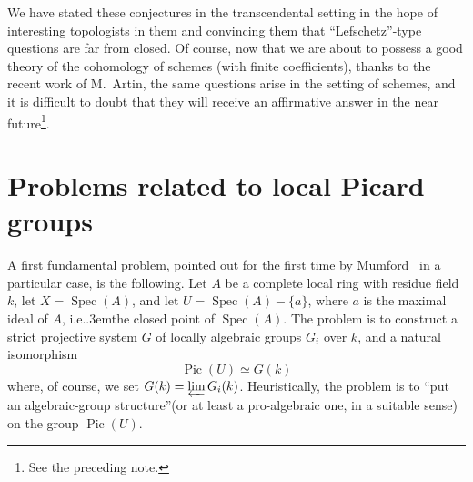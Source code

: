 \documentclass[11pt,a4paper,oneside]{book}
\providecommand{\sisi}[2]{#2}
\providecommand{\pageoriginale}{%
  \refstepcounter{pageoriginal}%
  \marginpar{\raggedright\footnotesize\bfseries\thepageoriginal}%
  \xspace}
\providecommand{\sfootnote}[1]{\footnote{#1}}
\providecommand{\og}{``}
\providecommand{\fg}{''\xspace}
\providecommand{\ie}{i.e.\kern.3em}
\providecommand{\Spec}{\operatorname{Spec}}
\providecommand{\Pic}{\operatorname{Pic}}
\theoremstyle{plain}
\theoremstyle{definition}
\theoremstyle{remark}
\begin{document}
We have stated these conjectures in the transcendental setting in the
hope of interesting topologists in them and convincing them that
\og Lefschetz\fg-type questions are far from closed. Of course, now that
we are about to possess a good theory of the cohomology of schemes (with
finite coefficients), thanks to the recent work of M.~\sisi{ARTIN}{Artin},
the same questions arise in the setting of schemes, and it is difficult
to doubt that they will receive an affirmative answer in the near
future\sfootnote{See the preceding note.}.

\section{Problems related to local Picard groups} \label{XIII.5}

A\pageoriginale first fundamental problem, pointed out for the first time by \sisi{MUMFORD}{Mumford}~\cite{XIII.5} in a particular case, is the following. Let $A$ be a complete local ring with residue field $k$, let $X=\Spec(A)$, and let $U=\Spec(A)-\{a\}$, where $a$ is the maximal ideal of $A$, \ie the closed point of $\Spec(A)$. The problem is to construct a strict projective system $G$ of locally algebraic groups $G_i$ over $k$, and a natural isomorphism
\begin{equation*} \label{eq:XIII.5.+} \tag{$+$} {\Pic(U)\simeq G(k)} \end{equation*}
where, of course, we set $G(k)=\varprojlim G_i(k)$. Heuristically, the problem is to \og put an algebraic-group structure\fg (or at least a pro-algebraic one, in a suitable sense) on the group $\Pic(\sisi{X'}{U})$.
\end{document}
